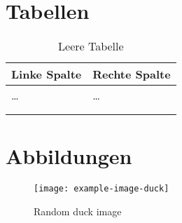 \documentclass[
    load-dhbw-templates,
    auto-intro-pages    = all, %
    add-tocs-to-toc,
    add-bibliography,
    biblatex/style      = alphabetic,            %
    bib-file            = biblatex-examples.bib, %
    debug,
    language            = ngerman, english
]{iodhbwm}
\begin{document}
    \chapter{Tabellen}
        \blindtext

        \begin{table}[htb]
            \centering
            \begin{tabular}{@{}ll@{}}
                \toprule
                Linke Spalte & Rechte Spalte\\\midrule
                \dots & \dots\\
                &\\
                &\\\bottomrule
            \end{tabular}
            \caption{Leere Tabelle}
        \end{table}

        \blindtext

    \chapter{Abbildungen}
        \blindtext

        \begin{figure}[htb]
            \centering
            \texttt{[image: example-image-duck]}
            \caption{Random duck image}
        \end{figure}

        \blindtext
        
        \Blinddocument

    \nocite{*}
\end{document}
